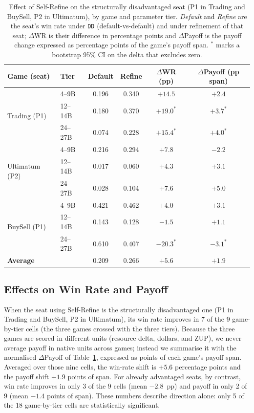 \begin{table}
\centering
\small
\caption{Effect of Self-Refine on the structurally disadvantaged seat (P1 in Trading and BuySell, P2 in Ultimatum), by game and parameter tier. \emph{Default} and \emph{Refine} are the seat's win rate under \texttt{DD} (default-vs-default) and under refinement of that seat; $\Delta$WR is their difference in percentage points and $\Delta$Payoff is the payoff change expressed as percentage points of the game's payoff span. $^{\ast}$ marks a bootstrap 95\% CI on the delta that excludes zero.}
\label{tab:self-refine-disadvantaged}
\begin{tabular}{llcccc}
\toprule
\textbf{Game (seat)} & \textbf{Tier} & \textbf{Default} & \textbf{Refine} & \textbf{$\Delta$WR (pp)} & \textbf{$\Delta$Payoff (pp span)} \\
\midrule
\multirow{3}{*}{Trading (P1)}
  & 4--9B   & 0.196 & 0.340 & $+14.5$        & $+2.4$ \\
  & 12--14B & 0.180 & 0.370 & $+19.0^{\ast}$ & $+3.7^{\ast}$ \\
  & 24--27B & 0.074 & 0.228 & $+15.4^{\ast}$ & $+4.0^{\ast}$ \\
\midrule
\multirow{3}{*}{Ultimatum (P2)}
  & 4--9B   & 0.216 & 0.294 & $+7.8$ & $-2.2$ \\
  & 12--14B & 0.017 & 0.060 & $+4.3$ & $+3.1$ \\
  & 24--27B & 0.028 & 0.104 & $+7.6$ & $+5.0$ \\
\midrule
\multirow{3}{*}{BuySell (P1)}
  & 4--9B   & 0.421 & 0.462 & $+4.0$         & $+3.1$ \\
  & 12--14B & 0.143 & 0.128 & $-1.5$         & $+1.1$ \\
  & 24--27B & 0.610 & 0.407 & $-20.3^{\ast}$ & $-3.1^{\ast}$ \\
\midrule
\multicolumn{2}{l}{\textbf{Average}} & 0.209 & 0.266 & $+5.6$ & $+1.9$ \\
\bottomrule
\end{tabular}
\end{table}


\subsection{Effects on Win Rate and Payoff}

When the seat using Self-Refine is the structurally disadvantaged one (P1 in Trading and BuySell, P2 in Ultimatum), its win rate improves in 7 of the 9 game-by-tier cells (the three games crossed with the three tiers). Because the three games are scored in different units (resource delta, dollars, and ZUP), we never average payoff in native units across games; instead we summarise it with the normalised $\Delta$Payoff of Table~\ref{tab:self-refine-disadvantaged}, expressed as points of each game's payoff span. Averaged over those nine cells, the win-rate shift is $+5.6$ percentage points and the payoff shift $+1.9$ points of span. For already advantaged seats, by contrast, win rate improves in only 3 of the 9 cells (mean $-2.8$~pp) and payoff in only 2 of 9 (mean $-1.4$ points of span). These numbers describe direction alone: only 5 of the 18 game-by-tier cells are statistically significant.

